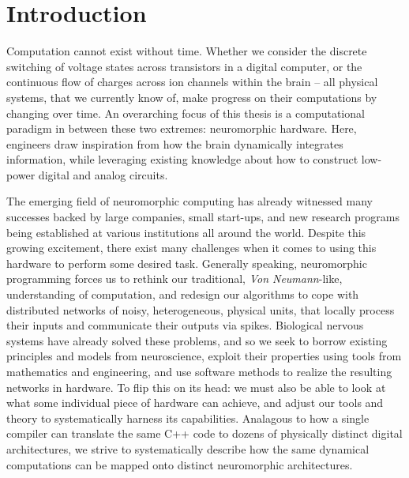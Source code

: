\chapter{Introduction}

Computation cannot exist without time.
Whether we consider the discrete switching of voltage states across transistors in a
digital computer,
or the continuous flow of charges across ion channels within the brain -- 
all physical systems, that we currently know of, make progress on their computations
by changing over time. An overarching focus of this thesis is a computational paradigm
in between these two extremes: neuromorphic hardware.
Here, engineers draw inspiration from how the
brain dynamically integrates information, while leveraging existing knowledge about
how to construct low-power digital and analog circuits.

The emerging field of neuromorphic computing has already
witnessed many successes backed by large companies, small start-ups, and new research
programs being established at various institutions all around the world.
Despite this growing excitement, there exist many challenges when it comes to using
this hardware to perform some desired task.
Generally speaking, neuromorphic programming forces us to rethink our traditional,
\emph{Von Neumann}-like, understanding of computation, and redesign our algorithms to cope with
distributed networks of noisy, heterogeneous, physical units, that locally process their inputs and communicate their outputs via spikes.
Biological nervous systems have already solved these problems, and so we seek to borrow existing
principles and models from neuroscience, exploit their properties using tools from mathematics and engineering,
and use software methods to realize the resulting networks in hardware.
To flip this on its head: we must also be able to look at what some individual piece of hardware can achieve,
and adjust our tools and theory to systematically harness its capabilities.
Analagous to how a single compiler can translate the same C++ code
to dozens of physically distinct digital architectures, we strive to systematically describe
how the same dynamical computations can be mapped onto distinct neuromorphic architectures.

